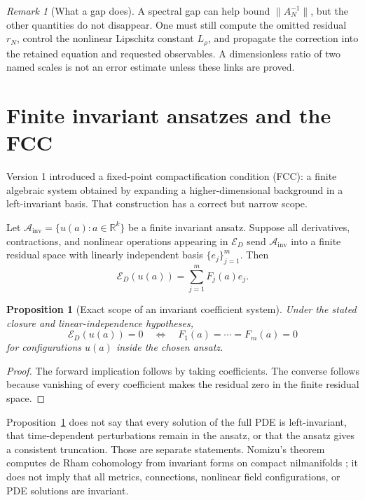 \documentclass[11pt]{article}
\newtheorem{proposition}[theorem]{Proposition}
\theoremstyle{definition}
\theoremstyle{remark}
\newtheorem{remark}[theorem]{Remark}
\newcommand{\cA}{\mathcal A}
\newcommand{\cE}{\mathcal E}
\begin{document}
\begin{remark}[What a gap does]
A spectral gap can help bound \(\|A_N^{-1}\|\), but the other quantities do
not disappear.  One must still compute the omitted residual \(r_N\), control
the nonlinear Lipschitz constant \(L_\rho\), and propagate the correction
into the retained equation and requested observables.  A dimensionless ratio
of two named scales is not an error estimate unless these links are proved.
\end{remark}

\section{Finite invariant ansatzes and the FCC}
\label{sec:fcc}

Version 1 introduced a fixed-point compactification condition (FCC): a
finite algebraic system obtained by expanding a higher-dimensional
background in a left-invariant basis.  That construction has a correct but
narrow scope.

Let \(\cA_{\mathrm{inv}}=\{u(a):a\in\mathbb R^k\}\) be a finite invariant
ansatz.  Suppose all derivatives, contractions, and nonlinear operations
appearing in \(\cE_D\) send \(\cA_{\mathrm{inv}}\) into a finite residual
space with linearly independent basis \(\{e_j\}_{j=1}^{m}\).  Then
\[
 \cE_D(u(a))=\sum_{j=1}^{m}F_j(a)e_j.
\]

\begin{proposition}[Exact scope of an invariant coefficient system]
\label{prop:fcc}
Under the stated closure and linear-independence hypotheses,
\[
 \cE_D(u(a))=0
 \quad\Longleftrightarrow\quad
 F_1(a)=\cdots=F_m(a)=0
\]
for configurations \(u(a)\) inside the chosen ansatz.
\end{proposition}

\begin{proof}
The forward implication follows by taking coefficients.  The converse
follows because vanishing of every coefficient makes the residual zero in
the finite residual space.
\end{proof}

Proposition~\ref{prop:fcc} does not say that every solution of the full PDE is
left-invariant, that time-dependent perturbations remain in the ansatz, or
that the ansatz gives a consistent truncation.  Those are separate
statements.  Nomizu's theorem computes de Rham cohomology from invariant
forms on compact nilmanifolds \cite{Nomizu1954}; it does not imply that all
metrics, connections, nonlinear field configurations, or PDE solutions are
invariant.
\end{document}
